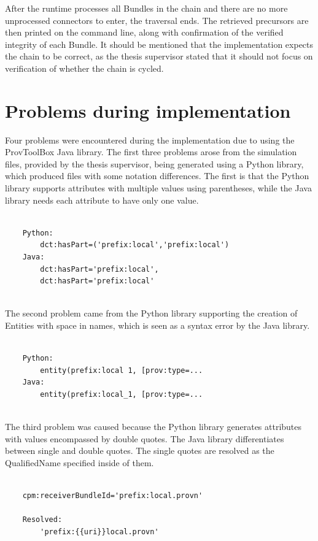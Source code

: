 \documentclass[
  digital,     %
  oneside,     %
  nosansbold,  %
  nocolorbold, %
  lof,         %
  lot,         %
]{fithesis4}
\begin{document}
After the runtime processes all Bundles in the chain and there are no more unprocessed connectors to enter, the traversal ends. The retrieved precursors are then printed on the command line, along with confirmation of the verified integrity of each Bundle. It should be mentioned that the implementation expects the chain to be correct, as the thesis supervisor stated that it should not focus on verification of whether the chain is cycled.

\section{Problems during implementation}
Four problems were encountered during the implementation due to using the ProvToolBox Java library. The first three problems arose from the simulation files, provided by the thesis supervisor, being generated using a Python library, which produced files with some notation differences. The first is that the Python library supports attributes with multiple values using parentheses, while the Java library needs each attribute to have only one value.

\begin{verbatim}

    Python: 
        dct:hasPart=('prefix:local','prefix:local')
    Java:
        dct:hasPart='prefix:local', 
        dct:hasPart='prefix:local' 
        
\end{verbatim}

The second problem came from the Python library supporting the creation of Entities with space in names, which is seen as a syntax error by the Java library.

\begin{verbatim}

    Python:
        entity(prefix:local 1, [prov:type=...
    Java:
        entity(prefix:local_1, [prov:type=... 
        
\end{verbatim}

The third problem was caused because the Python library generates attributes with values encompassed by double quotes. The Java library differentiates between single and double quotes. The single quotes are resolved as the QualifiedName specified inside of them.

\begin{verbatim}

    cpm:receiverBundleId='prefix:local.provn'
    
    Resolved:
        'prefix:{{uri}}local.provn'
        
\end{verbatim}
\end{document}
